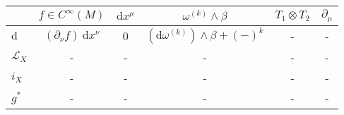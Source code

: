 \documentclass[a4paper,12pt]{scrartcl}
\begin{document}
  \begin{landscape}
    \thispagestyle{empty}
    \noindent
    \begin{tabularx}{\linewidth}{|X|c|c|c|c|c|}
      \hline
     	  & $f \in C^\infty(M)$ & $\textrm{d}x^\mu$ & $\omega^{(k)} \wedge \beta$ & $T_1 \otimes T_2$ & $\partial_\mu$ \\
      \hline
      	$\textrm{d}$ & $\left(\partial_\nu f \right) \: \textrm{d}x^\nu$ & 0 & $\left( \textrm{d} \omega^{(k)} \right) \wedge \beta + (-)^k $ & - & - \\
      	$\mathcal{L}_X$ & - & - & - & - & - \\
      	$i_X$  & - & - & - & - & - \\
      	$g^\ast$  & - & - & - & - & - \\
      \hline
    \end{tabularx}
  \end{landscape}
\end{document}

